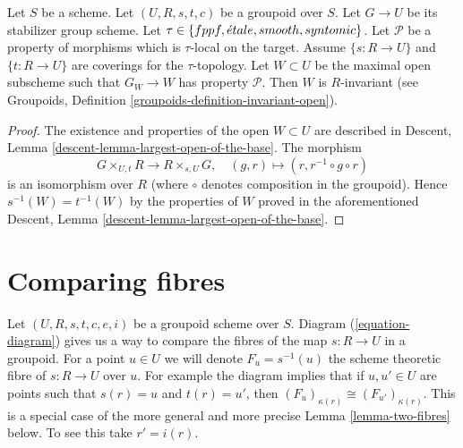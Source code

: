 \begin{lemma}
\label{lemma-property-G-invariant}
Let $S$ be a scheme.
Let $(U, R, s, t, c)$ be a groupoid over $S$.
Let $G \to U$ be its stabilizer group scheme.
Let $\tau \in \{fppf, \linebreak[0] \acute{e}tale,\linebreak[0]
smooth,\linebreak[0] syntomic\}$.
Let $\mathcal{P}$ be a property of morphisms which is $\tau$-local
on the target. Assume $\{s : R \to U\}$ and $\{t : R \to U\}$ are coverings
for the $\tau$-topology. Let $W \subset U$ be the maximal open subscheme
such that $G_W \to W$ has property $\mathcal{P}$. Then $W$ is $R$-invariant
(see
Groupoids, Definition
\ref{groupoids-definition-invariant-open}).
\end{lemma}

\begin{proof}
The existence and properties of the open $W \subset U$ are described in
Descent, Lemma \ref{descent-lemma-largest-open-of-the-base}.
The morphism
$$
G \times_{U, t} R \longrightarrow R \times_{s, U} G,\quad
(g, r) \longmapsto (r, r^{-1} \circ g \circ r)
$$
is an isomorphism over $R$ (where $\circ$ denotes
composition in the groupoid). Hence $s^{-1}(W) = t^{-1}(W)$ by the
properties of $W$ proved in the aforementioned
Descent, Lemma \ref{descent-lemma-largest-open-of-the-base}.
\end{proof}



\section{Comparing fibres}
\label{section-fibres}

\noindent
Let $(U, R, s, t, c, e, i)$ be a groupoid scheme over $S$.
Diagram (\ref{equation-diagram})
gives us a way to compare the fibres of the map $s : R \to U$ in a groupoid.
For a point $u \in U$ we will denote $F_u = s^{-1}(u)$ the scheme
theoretic fibre of $s : R \to U$ over $u$. For example the diagram
implies that if $u, u' \in U$ are points such
that $s(r) = u$ and $t(r) = u'$, then
$(F_u)_{\kappa(r)} \cong (F_{u'})_{\kappa(r)}$.
This is a special case of the more general and more precise
Lemma \ref{lemma-two-fibres}
below. To see this take $r' = i(r)$.

